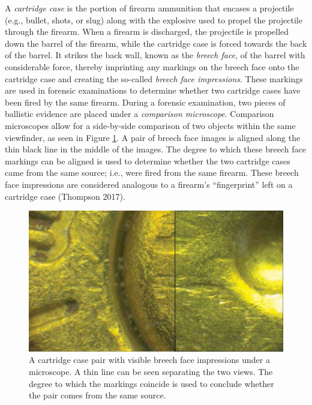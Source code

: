 A \emph{cartridge case} is the portion of firearm ammunition that encases a projectile (e.g., bullet, shots, or slug) along with the explosive used to propel the projectile through the firearm.
When a firearm is discharged, the projectile is propelled down the barrel of the firearm, while the cartridge case is forced towards the back of the barrel.
It strikes the back wall, known as the \emph{breech face}, of the barrel with considerable force, thereby imprinting any markings on the breech face onto the cartridge case and creating the so-called \emph{breech face impressions}.
These markings are used in forensic examinations to determine whether two cartridge cases have been fired by the same firearm.
During a forensic examination, two pieces of ballistic evidence are placed under a \emph{comparison microscope}.
Comparison microscopes allow for a side-by-side comparison of two objects within the same viewfinder, as seen in Figure \ref{fig:ccPair}.
A pair of breech face images is aligned along the thin black line in the middle of the images.
The degree to which these breech face markings can be aligned is used to determine whether the two cartridge cases came from the same source; i.e., were fired from the same firearm.
These breech face impressions are considered analogous to a firearm's ``fingerprint'' left on a cartridge case (Thompson 2017).

\begin{figure}[htbp]
\includegraphics[width=\textwidth]{images/cartridgeCasePair_comparison_with_line} \caption{A cartridge case pair with visible breech face impressions under a microscope.  A thin line can be seen separating the two views. The degree to which the markings coincide is used to conclude whether the pair comes from the same source.}\label{fig:ccPair}
\end{figure}

